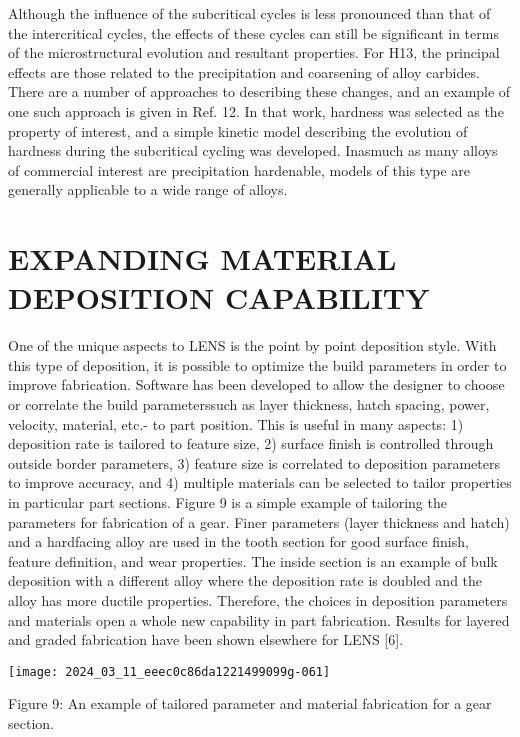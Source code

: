 \documentclass[10pt]{article}
\begin{document}
Although the influence of the subcritical cycles is less pronounced than that of the intercritical cycles, the effects of these cycles can still be significant in terms of the microstructural evolution and resultant properties. For H13, the principal effects are those related to the precipitation and coarsening of alloy carbides. There are a number of approaches to describing these changes, and an example of one such approach is given in Ref. 12. In that work, hardness was selected as the property of interest, and a simple kinetic model describing the evolution of hardness during the subcritical cycling was developed. Inasmuch as many alloys of commercial interest are precipitation hardenable, models of this type are generally applicable to a wide range of alloys.

\section*{EXPANDING MATERIAL DEPOSITION CAPABILITY}
One of the unique aspects to LENS is the point by point deposition style. With this type of deposition, it is possible to optimize the build parameters in order to improve fabrication. Software has been developed to allow the designer to choose or correlate the build parameterssuch as layer thickness, hatch spacing, power, velocity, material, etc.- to part position. This is useful in many aspects: 1) deposition rate is tailored to feature size, 2) surface finish is controlled through outside border parameters, 3) feature size is correlated to deposition parameters to improve accuracy, and 4) multiple materials can be selected to tailor properties in particular part sections. Figure 9 is a simple example of tailoring the parameters for fabrication of a gear. Finer parameters (layer thickness and hatch) and a hardfacing alloy are used in the tooth section for good surface finish, feature definition, and wear properties. The inside section is an example of bulk deposition with a different alloy where the deposition rate is doubled and the alloy has more ductile properties. Therefore, the choices in deposition parameters and materials open a whole new capability in part fabrication. Results for layered and graded fabrication have been shown elsewhere for LENS [6].

\begin{center}
\texttt{[image: 2024\_03\_11\_eeec0c86da1221499099g-061]}
\end{center}

Figure 9: An example of tailored parameter and material fabrication for a gear section.
\end{document}
